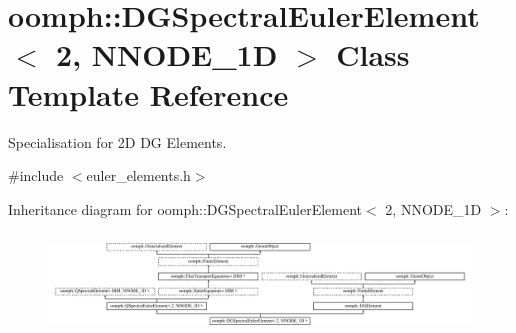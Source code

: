 \hypertarget{classoomph_1_1DGSpectralEulerElement_3_012_00_01NNODE__1D_01_4}{}\section{oomph\+:\+:D\+G\+Spectral\+Euler\+Element$<$ 2, N\+N\+O\+D\+E\+\_\+1D $>$ Class Template Reference}
\label{classoomph_1_1DGSpectralEulerElement_3_012_00_01NNODE__1D_01_4}


Specialisation for 2D DG Elements.  




{\ttfamily \#include $<$euler\+\_\+elements.\+h$>$}

Inheritance diagram for oomph\+:\+:D\+G\+Spectral\+Euler\+Element$<$ 2, N\+N\+O\+D\+E\+\_\+1D $>$\+:\begin{figure}[H]
\begin{center}
\leavevmode
\includegraphics[height=2.709677cm]{classoomph_1_1DGSpectralEulerElement_3_012_00_01NNODE__1D_01_4}
\end{center}
\end{figure}
